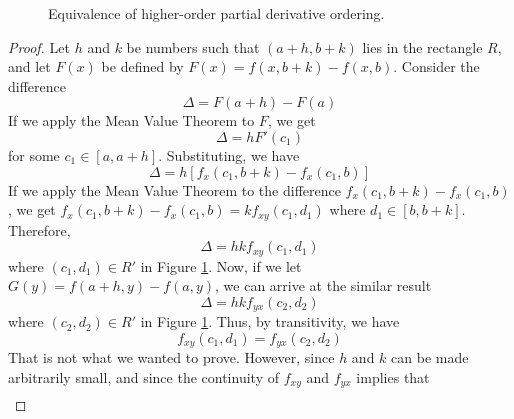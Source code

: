 \documentclass[../main.tex]{subfiles}
\begin{document}
\begin{itemize}
\begin{thm}
\begin{figure}[h!]
            \caption{Equivalence of higher-order partial derivative ordering.}
            \label{fig:pdvOrdering}
        \end{figure}
        \begin{proof}
            Let $h$ and $k$ be numbers such that $(a+h,b+k)$ lies in the rectangle $R$, and let $F(x)$ be defined by $F(x)=f(x,b+k)-f(x,b)$. Consider the difference
            \begin{equation*}
                \Delta = F(a+h)-F(a)
            \end{equation*}
            If we apply the Mean Value Theorem to $F$, we get
            \begin{equation*}
                \Delta = hF'(c_1)
            \end{equation*}
            for some $c_1\in[a,a+h]$. Substituting, we have
            \begin{equation*}
                \Delta = h[f_x(c_1,b+k)-f_x(c_1,b)]
            \end{equation*}
            If we apply the Mean Value Theorem to the difference $f_x(c_1,b+k)-f_x(c_1,b)$, we get $f_x(c_1,b+k)-f_x(c_1,b)=kf_{xy}(c_1,d_1)$ where $d_1\in[b,b+k]$. Therefore,
            \begin{equation*}
                \Delta = hkf_{xy}(c_1,d_1)
            \end{equation*}
            where $(c_1,d_1)\in R'$ in Figure \ref{fig:pdvOrdering}. Now, if we let $G(y)=f(a+h,y)-f(a,y)$, we can arrive at the similar result
            \begin{equation*}
                \Delta = hkf_{yx}(c_2,d_2)
            \end{equation*}
            where $(c_2,d_2)\in R'$ in Figure \ref{fig:pdvOrdering}. Thus, by transitivity, we have
            \begin{equation*}
                f_{xy}(c_1,d_1) = f_{yx}(c_2,d_2)
            \end{equation*}
            That is not what we wanted to prove. However, since $h$ and $k$ can be made arbitrarily small, and since the continuity of $f_{xy}$ and $f_{yx}$ implies that
            \begin{align*}

\end{align*}
\end{proof}
\end{thm}
\end{itemize}
\end{document}
